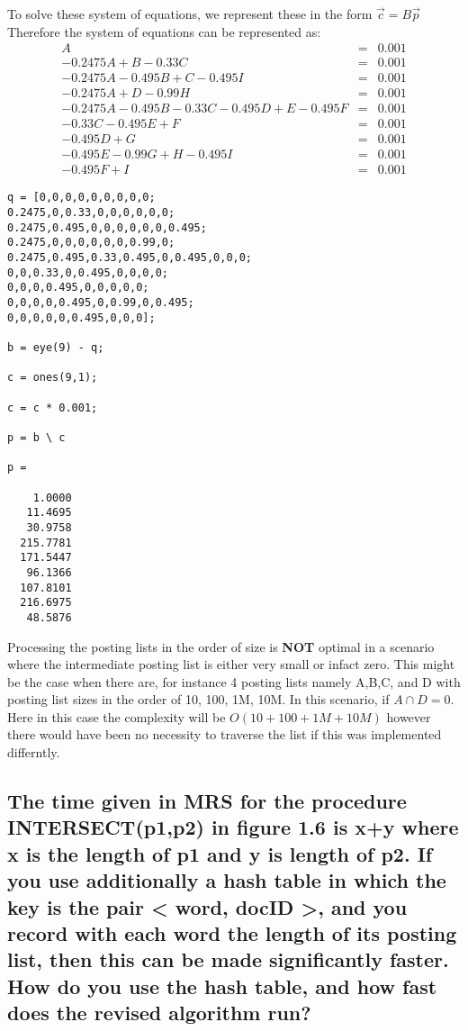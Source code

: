 \documentclass{article}
\begin{document}
To solve these system of equations, we represent these in the form $\vec{c} = B\vec{p}$
Therefore the system of equations can be represented as:
\[
\begin{array}{rcl}A & = & 0.001 \\ -0.2475A + B - 0.33C & = & 0.001 \\ -0.2475A - 0.495B + C - 0.495I & = & 0.001 \\ -0.2475A + D - 0.99H & = & 0.001 \\ -0.2475A - 0.495B - 0.33C -0.495D + E - 0.495F & = &0.001 \\ -0.33C - 0.495E + F & = & 0.001 \\ -0.495D + G & = & 0.001 \\ -0.495E - 0.99G + H - 0.495I & = & 0.001 \\ -0.495F + I & = & 0.001
\end{array}
\]
\begin{lstlisting}
q = [0,0,0,0,0,0,0,0,0;
0.2475,0,0.33,0,0,0,0,0,0;
0.2475,0.495,0,0,0,0,0,0,0.495;
0.2475,0,0,0,0,0,0,0.99,0;
0.2475,0.495,0.33,0.495,0,0.495,0,0,0;
0,0,0.33,0,0.495,0,0,0,0;
0,0,0,0.495,0,0,0,0,0;
0,0,0,0,0.495,0,0.99,0,0.495;
0,0,0,0,0,0.495,0,0,0];

b = eye(9) - q;

c = ones(9,1);

c = c * 0.001;

p = b \ c

p =

    1.0000
   11.4695
   30.9758
  215.7781
  171.5447
   96.1366
  107.8101
  216.6975
   48.5876
\end{lstlisting}
Processing the posting lists in the order of size is \textbf{NOT} optimal in a scenario where the intermediate posting list is either very small or infact zero. This might be the case when there are, for instance 4 posting lists namely A,B,C, and D with posting list sizes in the order of 10, 100, 1M, 10M. In this scenario, if $A \cap D = 0$. Here in this case the complexity will be $O(10 + 100 + 1M + 10M)$ however there would have been no necessity to traverse the list if this was implemented differntly.

\subsection{The time given in MRS for the procedure INTERSECT(p1,p2) in figure 1.6 is x+y where x is the length of p1 and y is length of p2. If you use additionally a hash table in which the key is the pair < word, docID >, and you record with each word the length of its posting list, then this can be made significantly faster. How do you use the hash table, and how fast does the revised algorithm run?}
\end{document}
